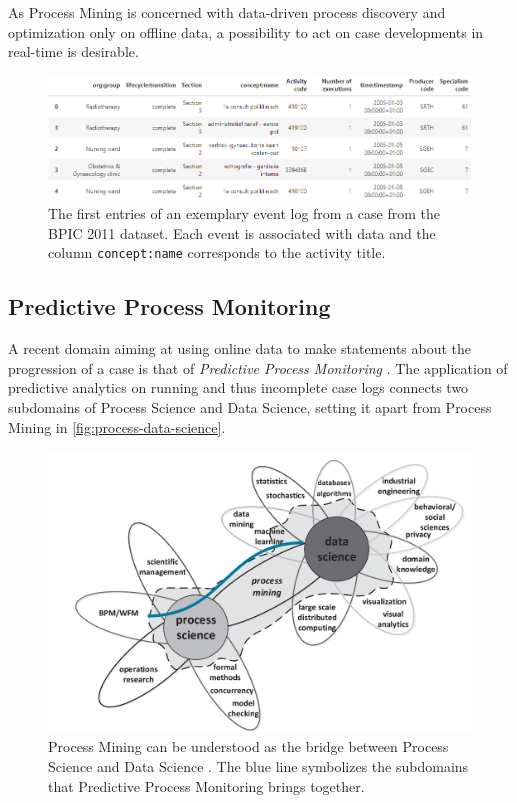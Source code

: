 As Process Mining is concerned with data-driven process discovery and optimization only on offline data, a possibility to act on case developments in real-time is desirable.

\begin{figure}
    \centering
    \includegraphics[width=\textwidth]{gfx/process-log}
    \caption{The first entries of an exemplary event log from a case from the BPIC 2011 dataset\cite{BPIC2011}. Each event is associated with data and the column \texttt{concept:name} corresponds to the activity title.}
    \label{fig:process-log}
\end{figure}

\subsection{Predictive Process Monitoring}
A recent domain aiming at using online data to make statements about the progression of a case is that of \textit{Predictive Process Monitoring} \cite{francescomarino2015, schoenig2018}. The application of predictive analytics on running and thus incomplete case logs connects two subdomains of Process Science and Data Science, setting it apart from Process Mining in \autoref{fig:process-data-science}.

\begin{figure}
    \centering
    \includegraphics[width=\textwidth]{gfx/process-data-science.png}
    \caption{Process Mining can be understood as the bridge between Process Science and Data Science \cite[p.18]{Aalst2016}. The blue line symbolizes the subdomains that Predictive Process Monitoring brings together.}
    \label{fig:process-data-science}
\end{figure}

